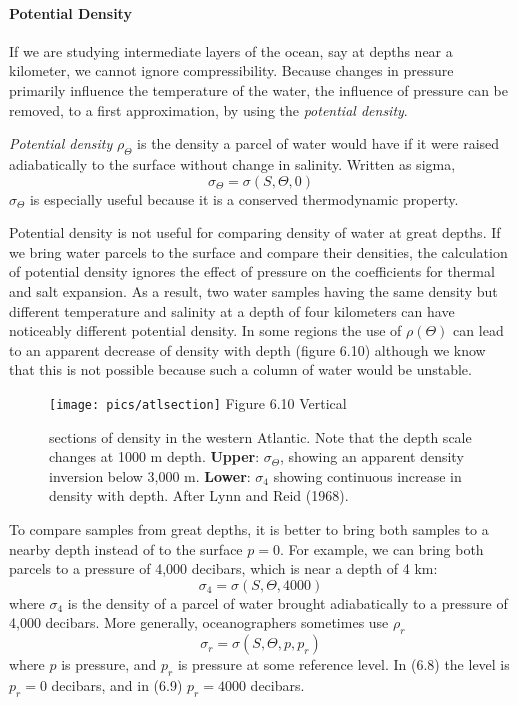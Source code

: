 \paragraph{Potential Density}
If we
are studying intermediate layers of the ocean, say at depths near a
kilometer, we cannot ignore compressibility. Because changes in
pressure primarily influence the temperature of the water, the
influence of pressure can be removed, to a first approximation, by
using the \textit{potential density}.

\textit{Potential density} $\rho _{\Theta}$ is the density a parcel of
water would have if it were raised adiabatically to the surface
without change in salinity. Written as sigma,
\begin{equation}
\sigma _{\Theta} = \sigma(S, \Theta, 0)
\end{equation}
$\sigma _{\Theta}$ is especially useful because it is a conserved
thermodynamic property.

Potential density is not useful for comparing density of water at
great depths. If we bring water parcels to the surface and compare
their densities, the calculation of potential density ignores the
effect of pressure on the coefficients for thermal and salt
expansion. As a result, two water samples having the same density but
different temperature and salinity at a depth of four kilometers can
have noticeably different potential density. In some regions the use
of $\rho(\Theta)$ can lead to an apparent decrease of density with
depth (figure 6.10) although we know that this is not possible because
such a column of water would be unstable.

\begin{figure}[b!]
\vspace{-2ex}
\texttt{[image: pics/atlsection]}
\footnotesize
Figure 6.10 Vertical \rule{0mm}{4ex}sections of density in the western
Atlantic.  Note that the depth scale changes at 1000 m
depth. \textbf{Upper}: $\sigma _{\Theta}$, showing an apparent density
inversion below 3,000 m. \textbf{Lower}: $\sigma _4$ showing
continuous increase in density with depth. After Lynn and Reid (1968).
\label{fig:atlsection4}
\end{figure}

To compare samples from great depths, it is better to bring both
samples to a nearby depth instead of to the surface $p = 0$. For
example, we can bring both parcels to a pressure of 4,000 decibars,
which is near a depth of 4 km:
\begin{equation}
\sigma_4 = \sigma(S, \Theta, 4000)
\end{equation}
where $\sigma_4$ is the density of a parcel of water brought
adiabatically to a pressure of 4,000 decibars. More generally,
oceanographers sometimes use $\rho_r$
\begin{equation}
\sigma _r = \sigma(S, \Theta, p, p_r)
\end{equation}
where $p$ is pressure, and $p_r$ is pressure at some reference
level. In (6.8) the level is $p_r = 0$ decibars, and in (6.9)
$p_r = 4000$ decibars.

